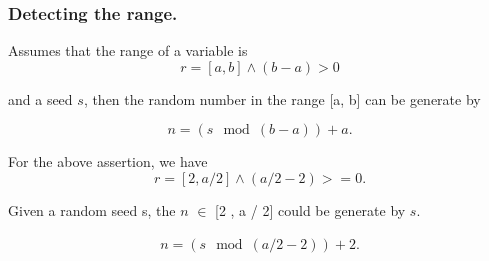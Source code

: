 \documentclass[runningheads]{llncs}
\begin{document}
\subsubsection{Detecting the range.} Assumes that the range of a variable is 
\begin{displaymath}
r = [a, b] \land (b-a) > 0
\end{displaymath}

\noindent and a seed $s$, then the random number in the range [a, b] can be generate by 

\begin{displaymath}
n = (s\mod(b - a)) + a.
\end{displaymath}


\noindent For the above assertion, we have  
\begin{displaymath}
r = [2 , a / 2] \land (a / 2 - 2) >= 0. 
\end{displaymath}

\noindent Given a random seed s, the $n$ $\in$ [2 , a / 2] could be generate by $s$.

\begin{gather}
n = (s\mod (a / 2 - 2)) + 2.
\end{gather}
\end{document}
